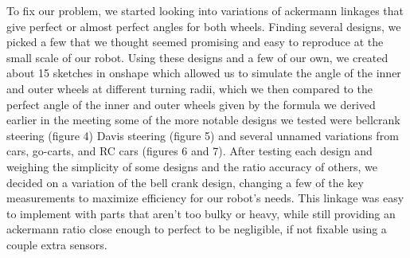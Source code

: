 To fix our problem, we started looking into variations of ackermann linkages that give perfect or almost perfect angles for both wheels. Finding several designs, we picked a few that we thought seemed promising and easy to reproduce at the small scale of our robot. Using these designs and a few of our own, we created about 15 sketches in onshape which allowed us to simulate the angle of the inner and outer wheels at different turning radii, which we then compared to the perfect angle of the inner and outer wheels given by the formula we derived earlier in the meeting some of the more notable designs we tested were bellcrank steering (figure 4) Davis steering (figure 5) and several unnamed variations from cars, go-carts, and RC cars (figures 6 and 7). After testing each design and weighing the simplicity of some designs and the ratio accuracy of others, we decided on a variation of the bell crank design, changing a few of the key measurements to maximize efficiency for our robot’s needs. This linkage was easy to implement with parts that aren’t too bulky or heavy, while still providing an ackermann ratio close enough to perfect to be negligible, if not fixable using a couple extra sensors. 

